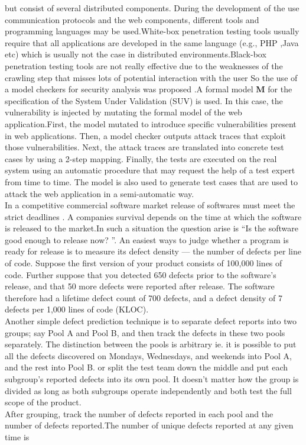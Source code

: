 but consist of several distributed components. During the
development of the use communication protocols and the web
components, different tools and programming languages may
be used.White-box penetration testing tools usually require that all applications are developed
in the same language (e.g., PHP ,Java etc) which is usually not the case in distributed environments.Black-box penetration testing tools are not really effective due to the weaknesses of
the crawling step that misses lots of potential interaction with the user So the use of a model checkers for security analysis was proposed  \cite{11}.A formal model \textbf{M} for the
specification of the System Under Validation (SUV) is  used.  In this case, the vulnerability is injected by
mutating the formal model of the web application.First, the model  mutated to introduce specific
vulnerabilities present in web applications. Then, a model checker outputs attack traces that exploit those vulnerabilities. 
Next, the attack traces are translated into concrete test cases by
using a 2-step mapping. Finally, the tests are executed on the
real system using an automatic procedure that may request the
help of a test expert from time to time. The model is also used to generate test cases that are used to attack the web application in a semi-automatic way.\\
\newline 
In a competitive commercial software market release of softwares must meet the strict deadlines \cite{12}. A companies survival depends on the time at which the software is released to the market.In such a situation the question arise is ``Is the software good enough to release now? ''. An easiest ways to judge whether a program is ready for release is to measure its defect density — the number of defects per
line of code. Suppose the first version of your
product consists  of 100,000 lines
of code. Further suppose that you detected 650
defects prior to the software's release, and that 50
more defects were reported after release. The
software therefore had a lifetime defect count of
700 defects, and a defect density of 7 defects per
1,000 lines of code (KLOC).\\
\newline
 Another simple defect prediction
 technique is to separate defect reports into two
 groups; say Pool A and Pool B, and then track the defects in these two pools separately. The distinction between the pools is arbitrary ie. it is possible to put all the defects discovered on
 Mondays, Wednesdays, and weekends into Pool
 A, and the rest into Pool B. or split the test team down the middle and put each subgroup's reported defects into its own pool. It
 doesn't matter how the group is divided as long as both subgroups operate independently and both
 test the full scope of the product.\\
 \newline
 After grouping, track the number of defects reported
 in each pool and the
 number of defects reported.The number of unique defects reported at any given time is\\
 
